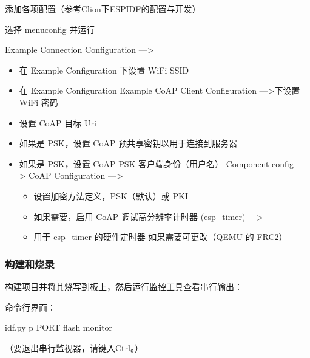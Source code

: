 \documentclass[a4paper,12pt,english]{sphinxmanual}
\begin{document}
{{\sphinxAtStartPar
添加各项配置（参考Clion下ESP\sphinxhyphen{}IDF的配置与开发）

\sphinxAtStartPar
选择 menuconfig 并运行

\sphinxAtStartPar
Example Connection Configuration —>
\begin{itemize}
\item {} 
\sphinxAtStartPar
在 Example Configuration 下设置 WiFi SSID

\item {} 
\sphinxAtStartPar
在 Example Configuration Example  CoAP Client Configuration —>下设置 WiFi 密码

\item {} 
\sphinxAtStartPar
设置 CoAP 目标 Uri

\item {} 
\sphinxAtStartPar
如果是 PSK，设置 CoAP 预共享密钥以用于连接到服务器

\item {} 
\sphinxAtStartPar
如果是 PSK，设置 CoAP PSK 客户端身份（用户名） Component config —> CoAP Configuration —>
\begin{itemize}
\item {} 
\sphinxAtStartPar
设置加密方法定义，PSK（默认）或 PKI

\item {} 
\sphinxAtStartPar
如果需要，启用 CoAP 调试高分辨率计时器 (esp\_timer) —>

\item {} 
\sphinxAtStartPar
用于 esp\_timer 的硬件定时器 \sphinxhyphen{} 如果需要可更改（QEMU 的 FRC2）

\end{itemize}

\end{itemize}


\subsubsection{构建和烧录}
\label{\detokenize{exp-esp32/coap:id10}}
\sphinxAtStartPar
构建项目并将其烧写到板上，然后运行监控工具查看串行输出：

\sphinxAtStartPar
命令行界面：

\begin{sphinxVerbatim}[commandchars=\\\{\}]
idf.py \PYGZhy{}p PORT flash monitor
\end{sphinxVerbatim}

\sphinxAtStartPar
（要退出串行监视器，请键入Ctrl\sphinxhyphen{}{]}。）

}}
\end{document}
